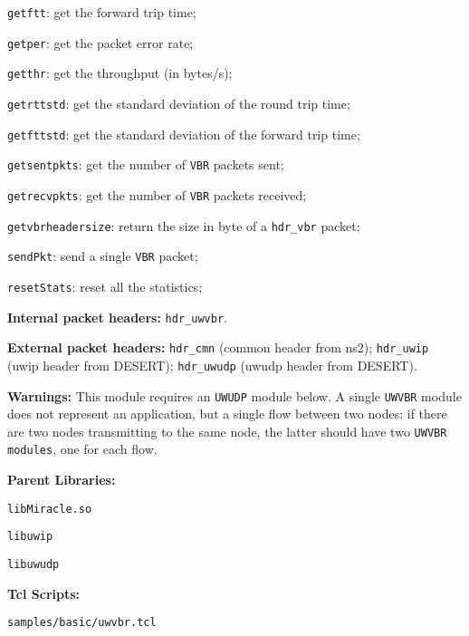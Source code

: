 \begin{description}
\begin{description}
    \item {\tt getftt}: get the forward trip time;
    \item {\tt getper}: get the packet error rate;
    \item {\tt getthr}: get the throughput (in bytes/s);
    \item {\tt getrttstd}: get the standard deviation of the round trip time;
    \item {\tt getfttstd}: get the standard deviation of the forward trip time;
    \item {\tt getsentpkts}: get the number of {\tt VBR} packets sent;
    \item {\tt getrecvpkts}: get the number of {\tt VBR} packets received;
    \item {\tt getvbrheadersize}: return the size in byte of a {\tt hdr\_vbr} packet;
    \item {\tt sendPkt}: send a single {\tt VBR} packet;
    \item {\tt resetStats}: reset all the statistics;
   \end{description}
   \item {\bf Internal packet headers:} {\tt hdr\_uwvbr}.
   \item {\bf External packet headers:} {\tt hdr\_cmn} (common header from ns2); {\tt hdr\_uwip} (uwip header from DESERT);  {\tt hdr\_uwudp} (uwudp header from DESERT).
   \item {\bf Warnings:} This module requires an {\tt UWUDP} module below. A single {\tt UWVBR} module does not represent an application, but a single flow between two nodes: if there are two nodes transmitting to the same node, the latter should have two {\tt UWVBR modules}, one for each flow.
   \item {\bf Parent Libraries:}
   \begin{description}
   \item {\tt libMiracle.so}
   \item {\tt libuwip}
   \item {\tt libuwudp}
   \end{description}
   \item {\bf Tcl Scripts:} 
   \begin{description}
   \item {\tt samples/basic/uwvbr.tcl}
   \end{description}
\end{description} 
